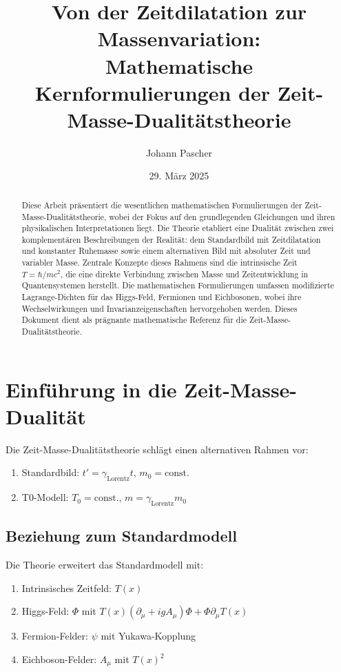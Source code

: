 \documentclass{article}
\title{Von der Zeitdilatation zur Massenvariation: \\ Mathematische Kernformulierungen der Zeit-Masse-Dualitätstheorie}
\author{Johann Pascher}
\date{29. März 2025}
\newcommand{\Tfield}{T(x)}
\newcommand{\DhiggsT}{\Tfield (\partial_\mu + igA_\mu)\Phi + \Phi \partial_\mu \Tfield}
\newcommand{\gammaf}{\gamma_{\text{Lorentz}}}
\theoremstyle{definition}
\theoremstyle{remark}
\begin{document}
	
	\maketitle
	
	\begin{abstract}
		Diese Arbeit präsentiert die wesentlichen mathematischen Formulierungen der Zeit-Masse-Dualitätstheorie, wobei der Fokus auf den grundlegenden Gleichungen und ihren physikalischen Interpretationen liegt. Die Theorie etabliert eine Dualität zwischen zwei komplementären Beschreibungen der Realität: dem Standardbild mit Zeitdilatation und konstanter Ruhemasse sowie einem alternativen Bild mit absoluter Zeit und variabler Masse. Zentrale Konzepte dieses Rahmens sind die intrinsische Zeit \( T = \hbar/mc^2 \), die eine direkte Verbindung zwischen Masse und Zeitentwicklung in Quantensystemen herstellt. Die mathematischen Formulierungen umfassen modifizierte Lagrange-Dichten für das Higgs-Feld, Fermionen und Eichbosonen, wobei ihre Wechselwirkungen und Invarianzeigenschaften hervorgehoben werden. Dieses Dokument dient als prägnante mathematische Referenz für die Zeit-Masse-Dualitätstheorie.
	\end{abstract}
	
	\tableofcontents
	\newpage
	
	\section{Einführung in die Zeit-Masse-Dualität}
	Die Zeit-Masse-Dualitätstheorie schlägt einen alternativen Rahmen vor:
	\begin{enumerate}
		\item Standardbild: \( t' = \gammaf t \), \( m_0 = \text{const.} \)
		\item T0-Modell: \( T_0 = \text{const.} \), \( m = \gammaf m_0 \)
	\end{enumerate}
	
	\subsection{Beziehung zum Standardmodell}
	Die Theorie erweitert das Standardmodell mit:
	\begin{enumerate}
		\item Intrinsisches Zeitfeld: \( \Tfield \)
		\item Higgs-Feld: \( \Phi \) mit \( \DhiggsT \)
		\item Fermion-Felder: \( \psi \) mit Yukawa-Kopplung
		\item Eichboson-Felder: \( A_\mu \) mit \( \Tfield^2 \)
	\end{enumerate}
	
\end{document}
